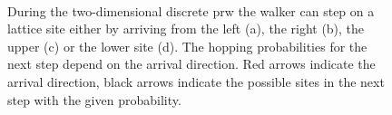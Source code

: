 \begin{figure}[bth]
    \myfloatalign
     \quad
    \\
     \quad
    \caption[\acl{prw} on a two-dimensional lattice]{During the two-dimensional discrete \ac{prw} the walker can step on a lattice site either by arriving from the left (a), the right (b), the upper (c) or the lower site (d). The hopping probabilities for the next step depend on the arrival direction. Red arrows indicate the arrival direction, black arrows indicate the possible sites in the next step with the given probability.}\label{fig:2DPRW}
\end{figure}

